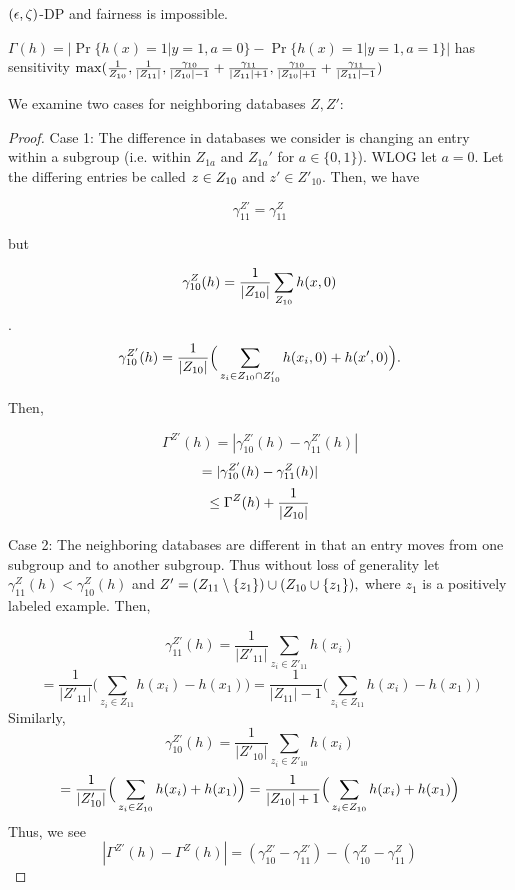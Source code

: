 \begin{lemma}
  $(\epsilon, \zeta)$-DP and fairness is impossible. 
\end{lemma}




\begin{lemma} $\Gamma(h) = |\Pr\{h(x) = 1 | y=1, a =0\} - \Pr\{h(x) = 1 | y = 1, a = 1\}|$ has sensitivity $\max(\frac{1}{Z_{10}},\frac{1}{|Z_{11}|}, \frac{\gamma_{10}}{|Z_{10}|-1} + \frac{\gamma_{11}}{|Z_{11}|+1}, \frac{\gamma_{10}}{|Z_{10}|+1} + \frac{\gamma_{11}}{|Z_{11}|-1})$
\end{lemma}

We examine two cases for neighboring databases $Z, Z'$:
\begin{proof}

Case 1: The difference in databases we consider is changing an entry within a subgroup
(i.e. within $Z_{1a}$ and $Z_{1a}'$ for $a \in \{0, 1\}$). WLOG let $a
= 0$. Let the differing entries be called $z \in Z_{10}$ and $z' \in
Z'_{10}$. Then, we have

$$\gamma^{Z'}_{11} = \gamma^Z_{11}$$

but

$$\gamma_{10}^Z(h) = \frac{1}{|Z_{10}|} \sum_{Z_{10}} h(x,0)$$.
$$\gamma_{10}^{Z'}(h) = \frac{1}{|Z_{10}|} \Big(\sum_{z_i \in Z_{10} \cap Z_{10}'} h(x_i, 0) + h(x', 0) \Big).$$

Then,

$$ \Gamma^{Z'}(h) = | \gamma_{10}^{Z'}(h) - \gamma_{11}^{Z'}(h) | $$
$$ = | \gamma_{10}^{Z'}(h) - \gamma_{11}^Z(h) | $$
$$ \leq \Gamma^{Z}(h) + \frac{1}{|Z_{10}|} $$


Case 2: The neighboring databases are different in that an entry moves from one subgroup and to another subgroup.
Thus without loss of generality let
$\gamma_{11}^{Z}(h) < \gamma_{10}^{Z}(h)$ and $Z' =(Z_{11}\setminus
\{z_1\} )\cup( Z_{10} \cup \{z_1\}),$ where $z_1$ is a positively labeled example. Then,

$$\gamma_{11}^{Z'}(h) = \frac{1}{|Z'_{11}|} \sum_{z_i \in Z'_{11}} h(x_i)$$
$$= \frac{1}{|Z'_{11}|} \Big(\sum_{z_i \in Z_{11}} h(x_i)-h(x_1)\Big) = \frac{1}{|Z_{11}|-1} \Big(\sum_{z_i \in Z_{11}} h(x_i)-h(x_1)\Big)$$
Similarly,
$$\gamma_{10}^{Z'}(h) = \frac{1}{|Z'_{10}|} \sum_{z_i \in Z'_{10}} h(x_i)$$
$$ = \frac{1}{|Z'_{10}|} \Big( \sum_{z_i \in Z_{10}} h(x_i)+h(x_1) \Big)= \frac{1}{|Z_{10}|+1} \Big( \sum_{z_i \in Z_{10}} h(x_i)+h(x_1) \Big)$$
%
Thus, we see
 $$|\Gamma^{Z'}(h) - \Gamma^{Z}(h)| = (\gamma_{10}^{Z'} - \gamma_{11}^{Z'}) - (\gamma_{10}^{Z} - \gamma_{11}^{Z})$$



\end{proof}
